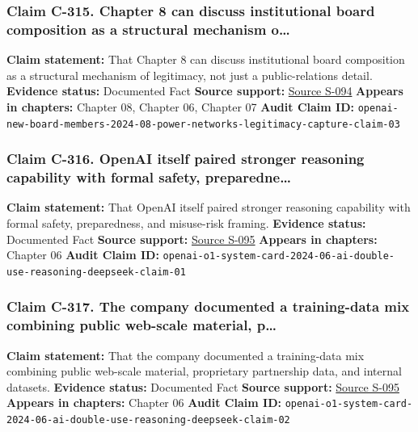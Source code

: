 \documentclass[
  american,
  11pt,
  letterpaper,
]{article}
\begin{document}
\subsubsection{Claim C-315. Chapter 8 can discuss institutional board
composition as a structural mechanism
o\ldots{}}\label{claim-c-315-chapter-8-can-discuss-institutional-board-composition-as-a-structural-mechanism-o}

\textbf{Claim statement:} That Chapter 8 can discuss institutional board
composition as a structural mechanism of legitimacy, not just a
public-relations detail. \textbf{Evidence status:} Documented Fact
\textbf{Source support:}
\hyperref[source-s-094-openai-announces-new-members-to-board-of-directors]{Source
S-094} \textbf{Appears in chapters:} Chapter 08, Chapter 06, Chapter 07
\textbf{Audit Claim ID:}
\texttt{openai-new-board-members-2024-08-power-networks-legitimacy-capture-claim-03}

\subsubsection{Claim C-316. OpenAI itself paired stronger reasoning
capability with formal safety,
preparedne\ldots{}}\label{claim-c-316-openai-itself-paired-stronger-reasoning-capability-with-formal-safety-preparedne}

\textbf{Claim statement:} That OpenAI itself paired stronger reasoning
capability with formal safety, preparedness, and misuse-risk framing.
\textbf{Evidence status:} Documented Fact \textbf{Source support:}
\hyperref[source-s-095-openai-o1-system-card]{Source S-095}
\textbf{Appears in chapters:} Chapter 06 \textbf{Audit Claim ID:}
\texttt{openai-o1-system-card-2024-06-ai-double-use-reasoning-deepseek-claim-01}

\subsubsection{Claim C-317. The company documented a training-data mix
combining public web-scale material,
p\ldots{}}\label{claim-c-317-the-company-documented-a-training-data-mix-combining-public-web-scale-material-p}

\textbf{Claim statement:} That the company documented a training-data
mix combining public web-scale material, proprietary partnership data,
and internal datasets. \textbf{Evidence status:} Documented Fact
\textbf{Source support:}
\hyperref[source-s-095-openai-o1-system-card]{Source S-095}
\textbf{Appears in chapters:} Chapter 06 \textbf{Audit Claim ID:}
\texttt{openai-o1-system-card-2024-06-ai-double-use-reasoning-deepseek-claim-02}
\end{document}
